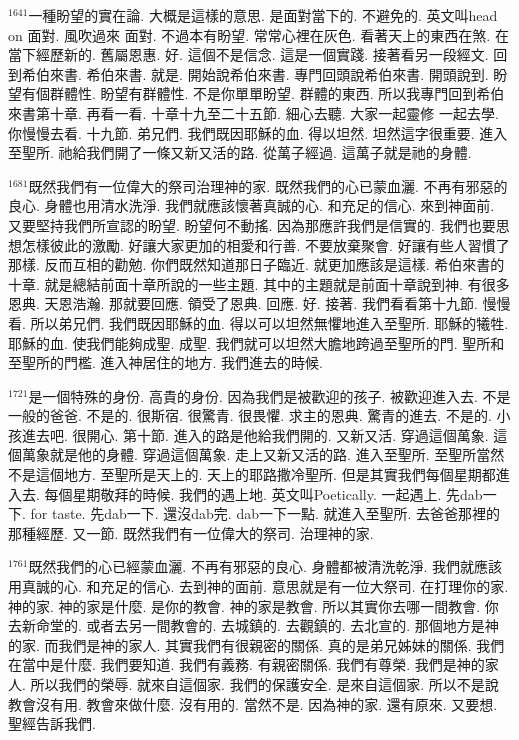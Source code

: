 \documentclass{book}
\begin{document}
$^{1641}$一種盼望的實在論.
大概是這樣的意思.
是面對當下的.
不避免的.
英文叫head on 面對.
風吹過來 面對.
不過本有盼望.
常常心裡在灰色.
看著天上的東西在煞.
在當下經歷新的.
舊屬恩惠.
好.
這個不是信念.
這是一個實踐.
接著看另一段經文.
回到希伯來書.
希伯來書.
就是.
開始說希伯來書.
專門回頭說希伯來書.
開頭說到.
盼望有個群體性.
盼望有群體性.
不是你單單盼望.
群體的東西.
所以我專門回到希伯來書第十章.
再看一看.
十章十九至二十五節.
細心去聽.
大家一起靈修 一起去學.
你慢慢去看.
十九節.
弟兄們.
我們既因耶穌的血.
得以坦然.
坦然這字很重要.
進入至聖所.
祂給我們開了一條又新又活的路.
從萬子經過.
這萬子就是祂的身體.

$^{1681}$既然我們有一位偉大的祭司治理神的家.
既然我們的心已蒙血灑.
不再有邪惡的良心.
身體也用清水洗淨.
我們就應該懷著真誠的心.
和充足的信心.
來到神面前.
又要堅持我們所宣認的盼望.
盼望何不動搖.
因為那應許我們是信實的.
我們也要思想怎樣彼此的激勵.
好讓大家更加的相愛和行善.
不要放棄聚會.
好讓有些人習慣了那樣.
反而互相的勸勉.
你們既然知道那日子臨近.
就更加應該是這樣.
希伯來書的十章.
就是總結前面十章所說的一些主題.
其中的主題就是前面十章說到神.
有很多恩典.
天恩浩瀚.
那就要回應.
領受了恩典.
回應.
好.
接著.
我們看看第十九節.
慢慢看.
所以弟兄們.
我們既因耶穌的血.
得以可以坦然無懼地進入至聖所.
耶穌的犧牲.
耶穌的血.
使我們能夠成聖.
成聖.
我們就可以坦然大膽地跨過至聖所的門.
聖所和至聖所的門檻.
進入神居住的地方.
我們進去的時候.

$^{1721}$是一個特殊的身份.
高貴的身份.
因為我們是被歡迎的孩子.
被歡迎進入去.
不是一般的爸爸.
不是的.
很斯宿.
很驚青.
很畏懼.
求主的恩典.
驚青的進去.
不是的.
小孩進去吧.
很開心.
第十節.
進入的路是他給我們開的.
又新又活.
穿過這個萬象.
這個萬象就是他的身體.
穿過這個萬象.
走上又新又活的路.
進入至聖所.
至聖所當然不是這個地方.
至聖所是天上的.
天上的耶路撒冷聖所.
但是其實我們每個星期都進入去.
每個星期敬拜的時候.
我們的遇上地.
英文叫Poetically.
一起遇上.
先dab一下.
for taste.
先dab一下.
還沒dab完.
dab一下一點.
就進入至聖所.
去爸爸那裡的那種經歷.
又一節.
既然我們有一位偉大的祭司.
治理神的家.

$^{1761}$既然我們的心已經蒙血灑.
不再有邪惡的良心.
身體都被清洗乾淨.
我們就應該用真誠的心.
和充足的信心.
去到神的面前.
意思就是有一位大祭司.
在打理你的家.
神的家.
神的家是什麼.
是你的教會.
神的家是教會.
所以其實你去哪一間教會.
你去新命堂的.
或者去另一間教會的.
去城鎮的.
去觀鎮的.
去北宣的.
那個地方是神的家.
而我們是神的家人.
其實我們有很親密的關係.
真的是弟兄姊妹的關係.
我們在當中是什麼.
我們要知道.
我們有義務.
有親密關係.
我們有尊榮.
我們是神的家人.
所以我們的榮辱.
就來自這個家.
我們的保護安全.
是來自這個家.
所以不是說教會沒有用.
教會來做什麼.
沒有用的.
當然不是.
因為神的家.
還有原來.
又要想.
聖經告訴我們.
\end{document}
